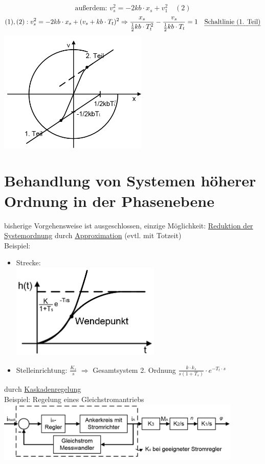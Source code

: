 \documentclass[openany,a4paper,11pt]{book}
\begin{document}
\begin{enumerate}
    \[ \text{außerdem: } v_s^2=-2kb\cdot x_s+v_1^2 \quad (2)\]
    \[(1),(2): v_s^2=-2kb\cdot x_s+(v_s+kb\cdot T_t)^2 \Rightarrow \frac{x_s}{\frac{1}{2}kb\cdot T_t^2}-\frac{v_s}{\frac{1}{2}kb\cdot T_t}=1 \quad \text{\uline{Schaltlinie (1. Teil)}}\]
    \includegraphics[width=2.8in]{imgs/NLR31.png}
\end{enumerate}
\section[Systemen höherer Ordnung]{Behandlung von Systemen höherer Ordnung in der Phasenebene}
bisherige Vorgehensweise ist ausgeschlossen, einzige Möglichkeit: \uline{Reduktion der Systemordnung} durch \uline{Approximation} (evtl. mit Totzeit)\\
Beispiel: \begin{itemize}
    \item Strecke:\\
    \includegraphics[width=2.8in]{imgs/NLR32.png}
    \item Stelleinrichtung: $\frac{K_s}{s}$ $\Rightarrow$ Gesamtsystem 2. Ordnung $\frac{k\cdot k_s}{s(1+T_s)}\cdot e^{-T_t\cdot s}$
\end{itemize}
durch \uline{Kaskadenregelung}\\
Beispiel: Regelung eines Gleichstromantriebs\\
\includegraphics[width=4.6in]{imgs/NLR33.png}
\end{document}
